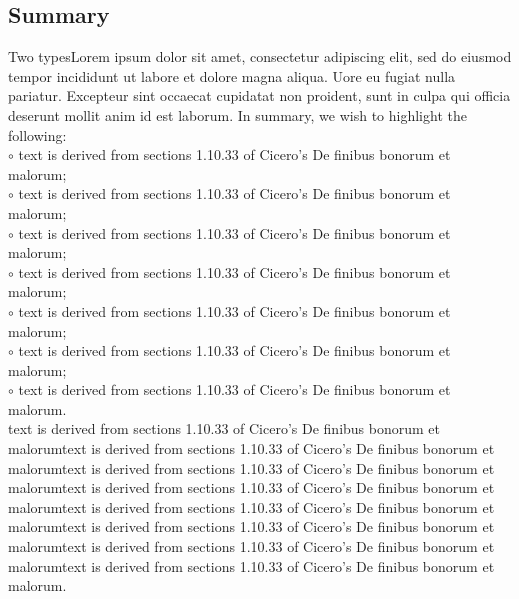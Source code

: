 \documentclass[a0,portrait]{a0poster}
\begin{document}
\begin{minipage}[c]{\linewidth}
\begin{framed}
\begin{multicols}{2}
\section*{Summary}
Two typesLorem ipsum dolor sit amet, consectetur adipiscing elit, sed do eiusmod tempor incididunt ut labore et dolore magna aliqua. Uore eu fugiat nulla pariatur. Excepteur sint occaecat cupidatat non proident, sunt in culpa qui officia deserunt mollit anim id est laborum. In summary, we wish to highlight the following:\\ 
\hspace{0.1cm}$\circ$ text is derived from sections 1.10.33 of Cicero's De finibus bonorum et malorum;\\
\hspace{0.1cm}$\circ$ text is derived from sections 1.10.33 of Cicero's De finibus bonorum et malorum;\\
\hspace{0.1cm}$\circ$ text is derived from sections 1.10.33 of Cicero's De finibus bonorum et malorum;\\ 
\hspace{0.1cm}$\circ$ text is derived from sections 1.10.33 of Cicero's De finibus bonorum et malorum;\\
\hspace{0.1cm}$\circ$ text is derived from sections 1.10.33 of Cicero's De finibus bonorum et malorum;\\
\hspace{0.1cm}$\circ$ text is derived from sections 1.10.33 of Cicero's De finibus bonorum et malorum;\\
\hspace{0.1cm}$\circ$ text is derived from sections 1.10.33 of Cicero's De finibus bonorum et malorum.\\
text is derived from sections 1.10.33 of Cicero's De finibus bonorum et malorumtext is derived from sections 1.10.33 of Cicero's De finibus bonorum et malorumtext is derived from sections 1.10.33 of Cicero's De finibus bonorum et malorumtext is derived from sections 1.10.33 of Cicero's De finibus bonorum et malorumtext is derived from sections 1.10.33 of Cicero's De finibus bonorum et malorumtext is derived from sections 1.10.33 of Cicero's De finibus bonorum et malorumtext is derived from sections 1.10.33 of Cicero's De finibus bonorum et malorumtext is derived from sections 1.10.33 of Cicero's De finibus bonorum et malorum.

\end{multicols}
\end{framed}
\end{minipage}
\end{document}
